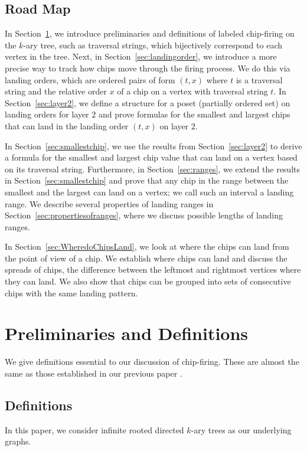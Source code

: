 \documentclass[11pt]{article}
\theoremstyle{definition}
\theoremstyle{remark}
\begin{document}
\subsection{Road Map}

In Section~\ref{sec:prelim}, we introduce preliminaries and definitions of labeled chip-firing on the $k$-ary tree, such as traversal strings, which bijectively correspond to each vertex in the tree. Next, in Section~\ref{sec:landingorder}, we introduce a more precise way to track how chips move through the firing process. We do this via landing orders, which are ordered pairs of form $(t,x)$ where $t$ is a traversal string and the relative order $x$ of a chip on a vertex with traversal string $t$. In Section~\ref{sec:layer2}, we define a structure for a poset (partially ordered set) on landing orders for layer $2$ and prove formulas for the smallest and largest chips that can land in the landing order $(t,x)$ on layer $2$.

In Section~\ref{sec:smallestchip}, we use the results from Section~\ref{sec:layer2} to derive a formula for the smallest and largest chip value that can land on a vertex based on its traversal string. Furthermore, in Section~\ref{sec:ranges}, we extend the results in Section~\ref{sec:smallestchip} and prove that any chip in the range between the smallest and the largest can land on a vertex; we call such an interval a landing range. We describe several properties of landing ranges in Section~\ref{sec:propertiesofranges}, where we discuss possible lengths of landing ranges.

In Section~\ref{sec:WheredoChipsLand}, we look at where the chips can land from the point of view of a chip. We establish where chips can land and discuss the spreads of chips, the difference between the leftmost and rightmost vertices where they can land. We also show that chips can be grouped into sets of consecutive chips with the same landing pattern.



\section{Preliminaries and Definitions}
\label{sec:prelim}
We give definitions essential to our discussion of chip-firing. These are almost the same as those established in our previous paper \cite{MR4887467}.

\subsection{Definitions}
\label{sec:definitions}
In this paper, we consider infinite rooted directed $k$-ary trees as our underlying graphs. 
\end{document}
